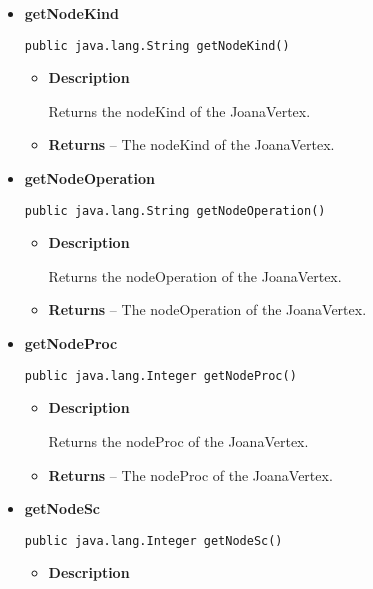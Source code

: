 {{{{{{{{{{{{{{{{{{{\begin{itemize}
{\begin{itemize}
{Returns the nodeEr of the JoanaVertex.
}
\item{{\bf  Returns} -- 
The nodeEr of the JoanaVertex. 
}%
\end{itemize}
}%
\item{ 
{\bf  getNodeKind}\\
\begin{lstlisting}[frame=none]
public java.lang.String getNodeKind()\end{lstlisting} %
\begin{itemize}
\item{
{\bf  Description}

Returns the nodeKind of the JoanaVertex.
}
\item{{\bf  Returns} -- 
The nodeKind of the JoanaVertex. 
}%
\end{itemize}
}%
\item{ 
{\bf  getNodeOperation}\\
\begin{lstlisting}[frame=none]
public java.lang.String getNodeOperation()\end{lstlisting} %
\begin{itemize}
\item{
{\bf  Description}

Returns the nodeOperation of the JoanaVertex.
}
\item{{\bf  Returns} -- 
The nodeOperation of the JoanaVertex. 
}%
\end{itemize}
}%
\item{ 
{\bf  getNodeProc}\\
\begin{lstlisting}[frame=none]
public java.lang.Integer getNodeProc()\end{lstlisting} %
\begin{itemize}
\item{
{\bf  Description}

Returns the nodeProc of the JoanaVertex.
}
\item{{\bf  Returns} -- 
The nodeProc of the JoanaVertex. 
}%
\end{itemize}
}%
\item{ 
{\bf  getNodeSc}\\
\begin{lstlisting}[frame=none]
public java.lang.Integer getNodeSc()\end{lstlisting} %
\begin{itemize}
\item{
{\bf  Description}

}
\end{itemize}}
\end{itemize}}}}}}}}}}}}}}}}}}}}
